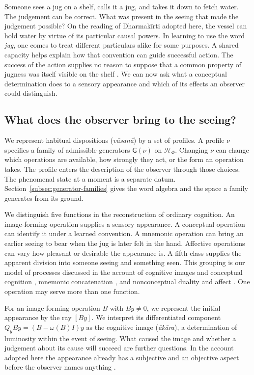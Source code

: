 \documentclass[11pt]{article}
\theoremstyle{definition}
\begin{document}
Someone sees a jug on a shelf, calls it a jug, and takes it down to fetch water. The judgement can be correct. What was present in the seeing that made the judgement possible? On the reading of Dharmak\=irti adopted here, the vessel can hold water by virtue of its particular causal powers. In learning to use the word \emph{jug}, one comes to treat different particulars alike for some purposes. A shared capacity helps explain how that convention can guide successful action. The success of the action supplies no reason to suppose that a common property of jugness was itself visible on the shelf \cite[pp.~90--94]{Yiannopoulos2020}. We can now ask what a conceptual determination does to a sensory appearance and which of its effects an observer could distinguish.

\subsection{What does the observer bring to the seeing?}
\label{subsec:ordinary-profile}

We represent habitual dispositions (\emph{v\=asan\=a}) by a set of profiles. A profile $\nu$ specifies a family of admissible generators $\mathsf G(\nu)$ on $\mathcal H_\Phi$. Changing $\nu$ can change which operations are available, how strongly they act, or the form an operation takes. The profile enters the description of the observer through those choices. The phenomenal state at a moment is a separate datum. Section~\ref{subsec:generator-families} gives the word algebra and the space a family generates from its ground.

We distinguish five functions in the reconstruction of ordinary cognition. An image-forming operation supplies a sensory appearance. A conceptual operation can identify it under a learned convention. A mnemonic operation can bring an earlier seeing to bear when the jug is later felt in the hand. Affective operations can vary how pleasant or desirable the appearance is. A fifth class supplies the apparent division into someone seeing and something seen. This grouping is our model of processes discussed in the account of cognitive images and conceptual cognition \cite[pp.~27--32, 64--70]{Yiannopoulos2020}, mnemonic concatenation \cite[pp.~114--115]{Yiannopoulos2020}, and nonconceptual duality and affect \cite[pp.~147--156, 414--428]{Yiannopoulos2020}. One operation may serve more than one function.

For an image-forming operation $B$ with $By\ne0$, we represent the initial appearance by the ray $[By]$. We interpret its differentiated component $Q_yBy=(B-\omega(B)I)y$ as the cognitive image (\emph{\=ak\=ara}), a determination of luminosity within the event of seeing. What caused the image and whether a judgement about its cause will succeed are further questions. In the account adopted here the appearance already has a subjective and an objective aspect before the observer names anything \cite[pp.~152--153]{Yiannopoulos2020}.
\end{document}
